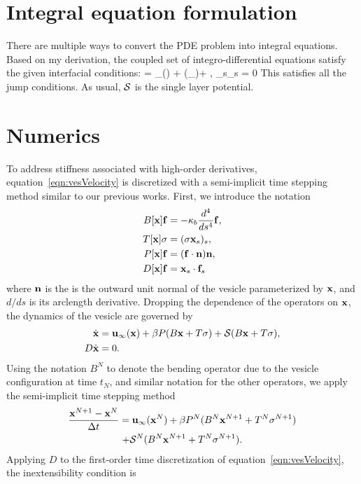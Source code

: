 \documentclass[aps,prl,twocolumn,showpacs]{revtex4}
\begin{document}
\section{Integral equation formulation}
There are multiple ways to convert the PDE problem into integral
equations. Based on my derivation, the coupled set of
integro-differential equations satisfy the given interfacial conditions:
\beq 
  \dot{\mbx} = \mbu_\infty(\mbx) + \beta (\mbf_\cdot\mbn)\mbn + , 
  \label{eqn:vesVelocity}
\eeq
\beq 
  \mbx_s\cdot\dot{\mbx}_s = 0 
\eeq
This satisfies all the jump conditions. As usual, $\mathcal{S}$ is the single layer potential. 

\section{Numerics}
To address stiffness associated with high-order derivatives,
equation~\eqref{eqn:vesVelocity} is discretized with a semi-implicit
time stepping method similar to our previous works.  First, we introduce
the notation
\begin{align}
  B[\mathbf{x}]\mathbf{f} &= -\kappa_b\frac{d^4}{ds^4} \mathbf{f}, \\
  T[\mathbf{x}]\sigma &= (\sigma \mathbf{x}_s)_s, \\
  P[\mathbf{x}]\mathbf{f} &= (\mathbf{f} \cdot \mathbf{n}) \mathbf{n}, \\
  D[\mathbf{x}]\mathbf{f} &= \mathbf{x}_s \cdot \mathbf{f}_s
\end{align}
where $\mathbf{n}$ is the is the outward unit normal of the vesicle
parameterized by $\mathbf{x}$, and $d/ds$ is its arclength derivative.
Dropping the dependence of the operators on $\mathbf{x}$, the dynamics of the
vesicle are governed by
\begin{align}
  \dot{\mathbf{x}} &= \mathbf{u}_{\infty}(\mathbf{x}) + 
  \beta P(B\mathbf{x} + T\sigma) + \mathcal{S}(B\mathbf{x} + T\sigma), \\
  D \dot{\mathbf{x}} &= 0.
\end{align}
Using the notation $B^N$ to denote the bending operator due to the
vesicle configuration at time $t_N$, and similar notation for the other
operators, we apply the semi-implicit time stepping method
\begin{multline}  
  \frac{\mathbf{x}^{N+1} - \mathbf{x}^N}{\Delta t} = \mathbf{u}_\infty(\mathbf{x}^N) 
  + \beta P^N(B^N\mathbf{x}^{N+1} + T^N\sigma^{N+1})  \\
  + \mathcal{S}^N(B^N\mathbf{x}^{N+1} + T^N\sigma^{N+1}).
\end{multline}
Applying $D$ to the first-order time discretization of
equation~\eqref{eqn:vesVelocity}, the inextensibility condition is
\end{document}
